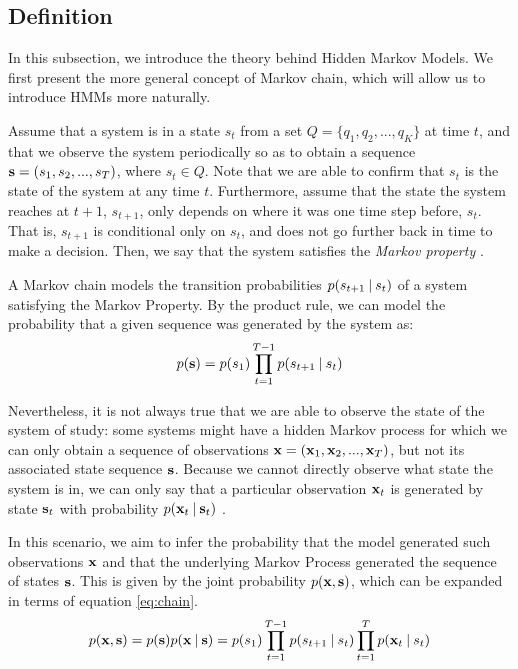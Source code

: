 \documentclass[../main.tex]{subfiles}
\begin{document}
\subsection{Definition} \label{subsection_defhmms}
In this subsection, we introduce the theory behind Hidden Markov Models. We first present the more general concept of Markov chain, which will allow us to introduce HMMs more naturally. 
\par Assume that a system is in a state $s_t$ from a set $Q = \{ q_1, q_2, ..., q_K \}$ at time $t$, and that we observe the system periodically so as to obtain a sequence $\mathbf{s} = \left( s_1, s_2, ..., s_T \right)$, where $s_t \in Q$. Note that we are able to confirm that $s_t$ is the state of the system at any time $t$. Furthermore, assume that the state the system reaches at $t+1$, $s_{t+1}$, only depends on where it was one time step before, $s_t$. That is, $s_{t+1}$ is conditional only on $s_{t}$, and does not go further back in time to make a decision. Then, we say that the system satisfies the \emph{Markov property} \cite{Murphy2012}.
\par A Markov chain models the transition probabilities $p(s_{t+1} \:\vert\: s_t)$ of a system satisfying the Markov Property. By the product rule, we can model the probability that a given sequence was generated by the system as:
\begin{equation}\label{eq:chain}
p(\mathbf{s}) = p(s_1)\prod_{t=1}^{T-1}p(s_{t+1} \:\vert\: s_t)
\end{equation}
\par Nevertheless, it is not always true that we are able to observe the state of the system of study: some systems might have a  hidden Markov process for which we can only obtain a sequence of observations $\mathbf{x} = \left( \mathbf{x}_1, \mathbf{x}_2, ..., \mathbf{x}_T \right)$, but not its associated state sequence $\mathbf{s}$. Because we cannot directly observe what state the system is in, we can only say that a particular observation $\mathbf{x}_t$ is generated by state $\mathbf{s}_t$ with probability $p(\mathbf{x}_t \:\vert\: \mathbf{s}_t)$ \cite{Murphy2012}. 
\par In this scenario, we aim to infer the probability that the model generated such observations $\mathbf{x}$ and that the underlying Markov Process generated the sequence of states $\mathbf{s}$. This is given by the joint probability $p(\mathbf{x}, \mathbf{s})$, which can be expanded in terms of equation \ref{eq:chain}.
\begin{equation}\label{eq:hmm}
p(\mathbf{x}, \mathbf{s}) = p(\mathbf{s})p(\mathbf{x} \:\vert\: \mathbf{s}) = p(s_1)\prod_{t=1}^{T-1}p(s_{t+1}\:\vert\: s_t)\prod_{t=1}^Tp(\mathbf{x}_t \:\vert\: s_t)
\end{equation} 
\end{document}
